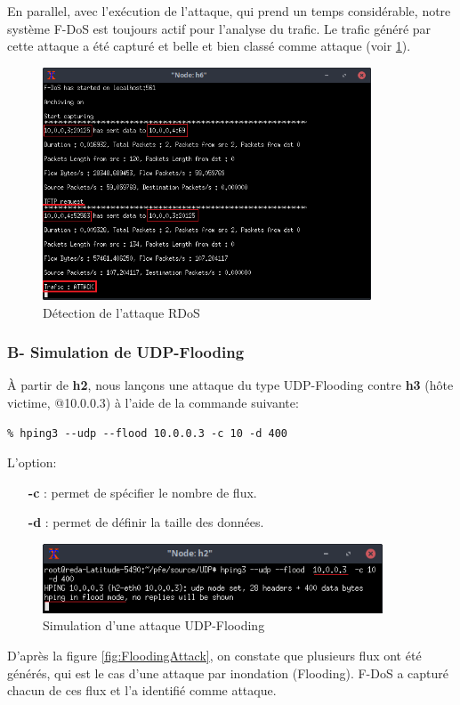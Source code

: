 \noindent En parallel, avec l'exécution de l'attaque, qui prend un temps considérable, notre système F-DoS est toujours actif pour l'analyse du trafic. Le trafic généré par cette attaque a été capturé et belle et bien classé comme attaque (voir \ref{fig:tftpAttack}).
\begin{figure}[h]
\centering
\includegraphics[width=0.87\textwidth]{Figures/simulation/mininet/IDS/attack_tftp}
\decoRule
\caption{Détection de l'attaque RDoS}
\label{fig:tftpAttack}
\end{figure}

\subsubsection{B- Simulation de UDP-Flooding}
À partir de \textbf{h2}, nous lançons une attaque du type UDP-Flooding contre \textbf{h3} (hôte victime, @10.0.0.3) à l'aide de la commande suivante:
\begin{verbatim}
% hping3 --udp --flood 10.0.0.3 -c 10 -d 400
\end{verbatim}
L'option:
\begin{itemize}
\item[\textbf{-c}]: permet de spécifier le nombre de flux.
\item[\textbf{-d}]: permet de définir la taille des données.
\end{itemize}
\begin{figure}[H]
\centering
\includegraphics[width=0.9\textwidth]{Figures/simulation/mininet/UDP/attack_udp_flood}
\decoRule
\caption{Simulation d'une attaque UDP-Flooding}
\label{fig:FloodingAttackSimulation}
\end{figure}
\newpage
D'après la figure \ref{fig:FloodingAttack}, on constate que plusieurs flux ont été générés, qui est le cas d'une attaque par inondation (Flooding). F-DoS a capturé chacun de ces flux et l'a identifié comme attaque.\\

